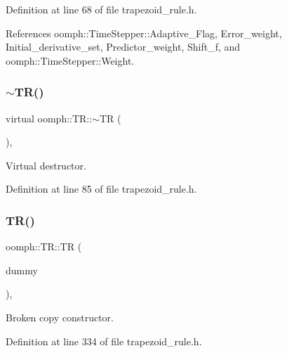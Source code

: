Definition at line 68 of file trapezoid\+\_\+rule.\+h.



References oomph\+::\+Time\+Stepper\+::\+Adaptive\+\_\+\+Flag, Error\+\_\+weight, Initial\+\_\+derivative\+\_\+set, Predictor\+\_\+weight, Shift\+\_\+f, and oomph\+::\+Time\+Stepper\+::\+Weight.

\mbox{\label{classoomph_1_1TR_a42fe5f88519d9b3645ab99520dc4ea5d}} 
\subsubsection{\texorpdfstring{$\sim$\+T\+R()}{~TR()}}
{\footnotesize\ttfamily virtual oomph\+::\+T\+R\+::$\sim$\+TR (\begin{DoxyParamCaption}{ }\end{DoxyParamCaption})\hspace{0.3cm}{\ttfamily [inline]}, {\ttfamily [virtual]}}



Virtual destructor. 



Definition at line 85 of file trapezoid\+\_\+rule.\+h.

\mbox{\label{classoomph_1_1TR_a1675eb2c3334926a9fa91c9969d6205e}} 
\subsubsection{\texorpdfstring{T\+R()}{TR()}\hspace{0.1cm}{\footnotesize\ttfamily [2/2]}}
{\footnotesize\ttfamily oomph\+::\+T\+R\+::\+TR (\begin{DoxyParamCaption}\item[{const \hyperlink{classoomph_1_1TR}{TR} \&}]{dummy }\end{DoxyParamCaption})\hspace{0.3cm}{\ttfamily [inline]}, {\ttfamily [private]}}



Broken copy constructor. 



Definition at line 334 of file trapezoid\+\_\+rule.\+h.



